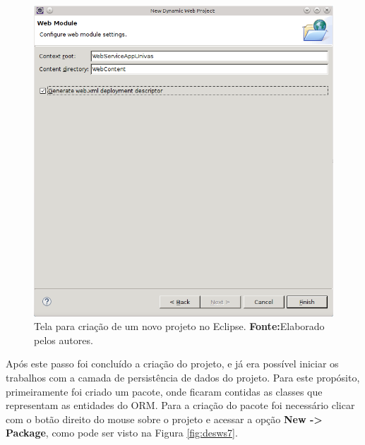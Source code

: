 	\begin{figure}[h!]
		\centerline{\includegraphics[scale=0.8]{./imagens/2_q_metodologico/4_procedimentos_resultados/43_webservice/432_desenvolvimento/desws6.png}}
		\caption[Tela para criação de um novo projeto no Eclipse]{Tela para criação de um novo projeto no Eclipse.
			\textbf{Fonte:}Elaborado pelos autores.}
		\label{fig:desws6}
	\end{figure}
	
	\pagebreak


	\par Após este passo foi concluído a criação do projeto, e já era possível
iniciar os trabalhos com a camada de persistência de dados do projeto. Para
este propósito, primeiramente foi criado um pacote, onde ficaram contidas as
classes que representam as entidades do ORM. Para a criação do pacote foi
necessário clicar com o botão direito do mouse sobre o projeto e acessar a opção
\textbf{New -> Package}, como pode ser visto na Figura \ref{fig:desws7}.

